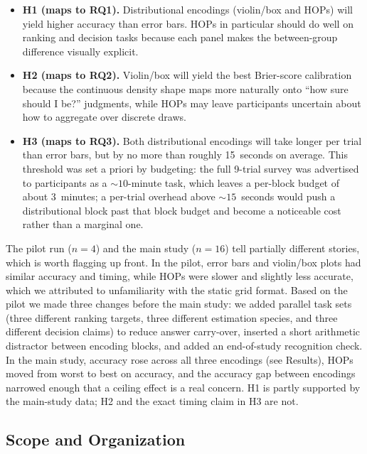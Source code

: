 \documentclass{article}
\begin{document}
\begin{itemize}[leftmargin=*, itemsep=4pt]
\item \textbf{H1 (maps to RQ1).}  Distributional encodings (violin/box
  and HOPs) will yield higher accuracy than error bars.  HOPs in
  particular should do well on ranking and decision tasks because each
  panel makes the between-group difference visually explicit.
\item \textbf{H2 (maps to RQ2).}  Violin/box will yield the best
  Brier-score calibration because the continuous density shape maps
  more naturally onto ``how sure should I be?'' judgments, while HOPs
  may leave participants uncertain about how to aggregate over
  discrete draws.
\item \textbf{H3 (maps to RQ3).}  Both distributional encodings will
  take longer per trial than error bars, but by no more than roughly
  15~seconds on average.  This threshold was set a priori by
  budgeting: the full 9-trial survey was advertised to participants as
  a $\sim 10$-minute task, which leaves a per-block budget of about
  3~minutes; a per-trial overhead above $\sim 15$~seconds would
  push a distributional block past that block budget and become a
  noticeable cost rather than a marginal one.
\end{itemize}

The pilot run ($n = 4$) and the main study ($n = 16$) tell partially
different stories, which is worth flagging up front.  In the pilot,
error bars and violin/box plots had similar accuracy and timing, while
HOPs were slower and slightly less accurate, which we attributed to
unfamiliarity with the static grid format.  Based on the pilot we made
three changes before the main study: we added parallel task sets
(three different ranking targets, three different estimation species,
and three different decision claims) to reduce answer carry-over,
inserted a short arithmetic distractor between encoding blocks, and
added an end-of-study recognition check.  In the main study, accuracy
rose across all three encodings (see Results), HOPs moved from worst
to best on accuracy, and the accuracy gap between encodings narrowed
enough that a ceiling effect is a real concern.  H1 is partly
supported by the main-study data; H2 and the exact timing claim in H3
are not.

\subsection{Scope and Organization}
\end{document}
